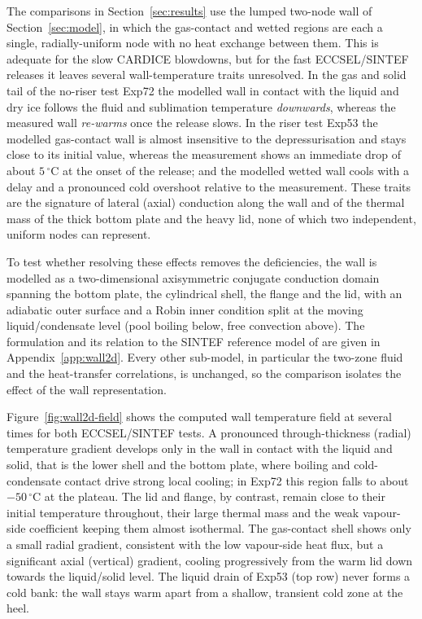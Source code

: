 \documentclass[5p,authoryear]{elsarticle}
\begin{document}
The comparisons in Section~\ref{sec:results} use the lumped two-node wall of
Section~\ref{sec:model}, in which the gas-contact and wetted regions are each a single,
radially-uniform node with no heat exchange between them. This is adequate for the slow CARDICE
blowdowns, but for the fast ECCSEL/SINTEF releases it leaves several wall-temperature traits unresolved.
In the gas and solid tail of the no-riser test Exp72 the modelled wall in contact with the liquid
and dry ice follows the fluid and sublimation temperature \emph{downwards}, whereas the measured
wall \emph{re-warms} once the release slows. In the riser test Exp53 the modelled gas-contact wall
is almost insensitive to the depressurisation and stays close to its initial value, whereas the
measurement shows an immediate drop of about $5\,^\circ$C at the onset of the release; and the
modelled wetted wall cools with a delay and a pronounced cold overshoot relative to the
measurement. These traits are the signature of lateral (axial) conduction along the wall and of the
thermal mass of the thick bottom plate and the heavy lid, none of which two independent, uniform
nodes can represent.

To test whether resolving these effects removes the deficiencies, the wall is modelled as a
two-dimensional axisymmetric conjugate conduction domain spanning the bottom plate, the cylindrical
shell, the flange and the lid, with an adiabatic outer surface and a Robin inner condition split at
the moving liquid/condensate level (pool boiling below, free convection above). The formulation and
its relation to the SINTEF reference model of \citet{Hoydalsvik2026} are given in
Appendix~\ref{app:wall2d}. Every other sub-model, in particular the two-zone fluid and the
heat-transfer correlations, is unchanged, so the comparison isolates the effect of the wall
representation.

Figure~\ref{fig:wall2d-field} shows the computed wall temperature field at several times for both
ECCSEL/SINTEF tests. A pronounced through-thickness (radial) temperature gradient develops only in the
wall in contact with the liquid and solid, that is the lower shell and the bottom plate, where
boiling and cold-condensate contact drive strong local cooling; in Exp72 this region falls to about
$-50\,^\circ$C at the plateau. The lid and flange, by contrast, remain close to their initial
temperature throughout, their large thermal mass and the weak vapour-side coefficient keeping them
almost isothermal. The gas-contact shell shows only a small radial gradient, consistent with the
low vapour-side heat flux, but a significant axial (vertical) gradient, cooling progressively from
the warm lid down towards the liquid/solid level. The liquid drain of Exp53 (top row) never forms a
cold bank: the wall stays warm apart from a shallow, transient cold zone at the heel.
\end{document}
